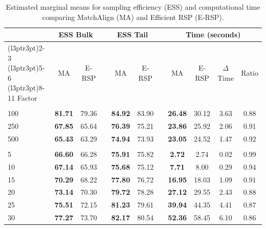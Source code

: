 \documentclass[
  man,
  longtable,
  nolmodern,
  notxfonts,
  notimes,
  colorlinks=true,linkcolor=blue,citecolor=blue,urlcolor=blue]{apa7}
\theoremstyle{plain}
\theoremstyle{plain}
\theoremstyle{remark}
\begin{document}
\begin{table}
\centering
\caption{\label{tab:simres_2_eff}Estimated marginal means for sampling efficiency (ESS) and computational time comparing MatchAlign (MA) and Efficient RSP (E-RSP).}
\centering
\begin{threeparttable}
\begin{tabular}[t]{lcccccccccc}
\toprule
\multicolumn{1}{c}{ } & \multicolumn{2}{c}{ESS Bulk} & \multicolumn{1}{c}{ } & \multicolumn{2}{c}{ESS Tail} & \multicolumn{1}{c}{ } & \multicolumn{4}{c}{Time (seconds)} \\
\cmidrule(l{3pt}r{3pt}){2-3} \cmidrule(l{3pt}r{3pt}){5-6} \cmidrule(l{3pt}r{3pt}){8-11}
Factor & MA & E-RSP &  & MA & E-RSP &  & MA & E-RSP & $\Delta$Time & Ratio\\
\midrule
\addlinespace[0.3em]
\multicolumn{11}{l}{\textbf{N}}\\
\hspace{1em}100 & \textbf{81.71} & 79.36 &  & \textbf{84.92} & 83.90 &  & \textbf{26.48} & 30.12 & 3.63 & 0.88\\
\hspace{1em}250 & \textbf{67.85} & 65.64 &  & \textbf{76.39} & 75.21 &  & \textbf{23.86} & 25.92 & 2.06 & 0.91\\
\hspace{1em}500 & \textbf{65.43} & 63.29 &  & \textbf{74.94} & 73.93 &  & \textbf{23.05} & 24.52 & 1.47 & 0.92\\
\addlinespace[0.3em]
\multicolumn{11}{l}{\textbf{M}}\\
\hspace{1em}5 & \textbf{66.60} & 66.28 &  & \textbf{75.91} & 75.82 &  & \textbf{2.72} & 2.74 & 0.02 & 0.99\\
\hspace{1em}10 & \textbf{67.14} & 65.93 &  & \textbf{75.68} & 75.12 &  & \textbf{7.71} & 8.00 & 0.29 & 0.94\\
\hspace{1em}15 & \textbf{70.29} & 68.22 &  & \textbf{77.80} & 76.72 &  & \textbf{16.95} & 18.03 & 1.09 & 0.91\\
\hspace{1em}20 & \textbf{73.14} & 70.30 &  & \textbf{79.72} & 78.28 &  & \textbf{27.12} & 29.55 & 2.43 & 0.88\\
\hspace{1em}25 & \textbf{75.51} & 72.15 &  & \textbf{81.23} & 79.61 &  & \textbf{39.94} & 44.35 & 4.41 & 0.87\\
\hspace{1em}30 & \textbf{77.27} & 73.70 &  & \textbf{82.17} & 80.54 &  & \textbf{52.36} & 58.45 & 6.10 & 0.86\\

\end{tabular}
\end{threeparttable}
\end{table}
\end{document}
